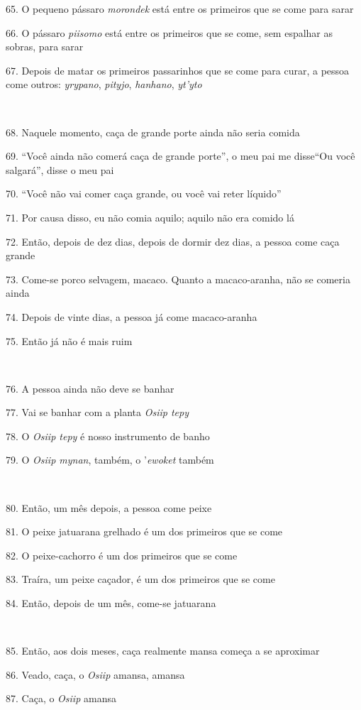 65. O pequeno pássaro \emph{morondek} está entre os primeiros que se come
para sarar

66. O pássaro \emph{piisomo} está entre os primeiros que se come, sem
espalhar as sobras, para sarar

67. Depois de matar os primeiros passarinhos que se come para curar, a
pessoa come outros: \emph{yrypano}, \emph{pityjo}, \emph{hanhano},
\emph{yt'yto}

~

68. Naquele momento, caça de grande porte ainda não seria comida

69. ``Você ainda não comerá caça de grande porte'', o meu pai me
disse``Ou você salgará'', disse o meu pai

70. ``Você não vai comer caça grande, ou você vai reter líquido''

71. Por causa disso, eu não comia aquilo; aquilo não era comido lá

72. Então, depois de dez dias, depois de dormir dez dias, a pessoa come
caça grande

73. Come-se porco selvagem, macaco. Quanto a macaco-aranha, não se comeria ainda

74. Depois de vinte dias, a pessoa já come macaco-aranha

75. Então já não é mais ruim

~

76. A pessoa ainda não deve se banhar

77. Vai se banhar com a planta \emph{Osiip tepy}

78. O \emph{Osiip tepy} é nosso instrumento de banho

79. O \emph{Osiip mynan}, também, o '\emph{ewoket} também

~

80. Então, um mês depois, a pessoa come peixe

81. O peixe jatuarana grelhado é um dos primeiros que se come

82. O peixe-cachorro é um dos primeiros que se come

83. Traíra, um peixe caçador, é um dos primeiros que se come

84. Então, depois de um mês, come-se jatuarana

~

85. Então, aos dois meses, caça realmente mansa começa a se aproximar

86. Veado, caça, o \emph{Osiip} amansa, amansa

87. Caça, o \emph{Osiip} amansa

